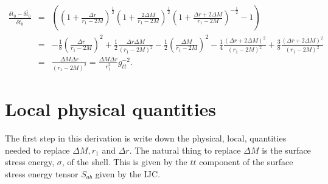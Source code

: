 \documentclass[aps,showpacs,onecolumn,floats,prd,superscriptaddress,nofootinbib]{revtex4-1}
\begin{document}
\begin{eqnarray}
	\frac{\delta t_0 - \bar{\delta t_0}}{\delta \bar{t_0}} & = & 
	\left( \left( 1+ \frac{\Delta r}{r_1 - 2M} \right)^\frac{1}{2} \left( 1 + \frac{2\Delta M}{r_1 - 2M} \right)^\frac{1}{2} \left( 1 + \frac{\Delta r + 2 \Delta M}{r_1 - 2M} \right)^{-\frac{1}{2}} - 1 \right)	\nonumber	\\
	& = & - \frac{1}{8} \left( \frac{\Delta r}{r_1 - 2M} \right)^2 + 
	\frac{1}{2} \frac{\Delta r \Delta M}{(r_1 - 2M)^2} - 
	\frac{1}{2} \left( \frac{\Delta M}{r_1 - 2M} \right)^2 - 
	\frac{1}{4} \frac{( \Delta r + 2 \Delta M)^2}{(r_1 - 2M)^2} + 
	\frac{3}{8} \frac{(\Delta r+ 2 \Delta M)^2}{(r_1 - 2M)^2} 	\nonumber	\\
	& = & \frac{\Delta M \Delta r}{(r_1 - 2M)^2} = \frac{\Delta M \Delta r}{r_1^2} g_{tt}^{-2}.
\end{eqnarray}
	
%
%

\section{Local physical quantities}
\label{finalEq}

The first step in this derivation is write down the physical, local, quantities needed to replace $\Delta M, r_1$ and $\Delta r$. The natural thing to replace $\Delta M$ is the surface stress energy, $\sigma$, of the shell. This is given by the $tt$ component of the surface stress energy tensor $S_{ab}$ given by the IJC.
\end{document}
